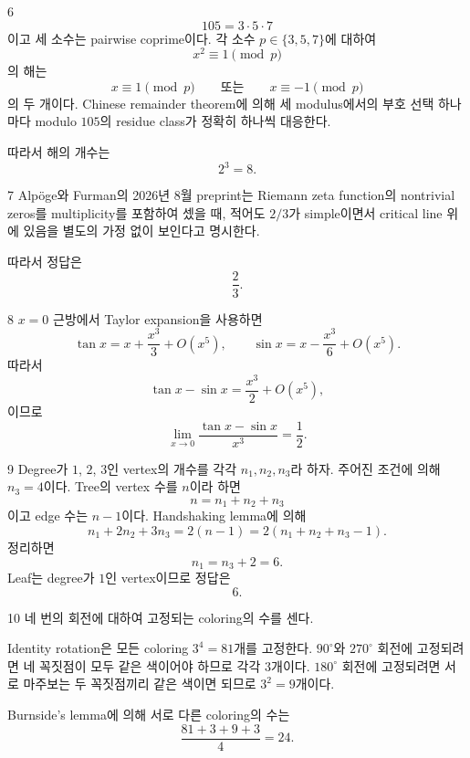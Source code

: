 \documentclass[11pt,oneside]{article}
\begin{document}
\begin{problemsolution}{6}
\[
    105=3\cdot5\cdot7
\]
이고 세 소수는 pairwise coprime이다. 각 소수 $p\in\{3,5,7\}$에 대하여
\[
    x^2\equiv1\pmod p
\]
의 해는
\[
    x\equiv1\pmod p
    \qquad\text{또는}\qquad
    x\equiv-1\pmod p
\]
의 두 개이다. Chinese remainder theorem에 의해 세 modulus에서의 부호 선택 하나마다 modulo $105$의 residue class가 정확히 하나씩 대응한다.

따라서 해의 개수는
\[
    2^3=\boxed{8}.
\]
\end{problemsolution}

\begin{problemsolution}{7}
Alp\"oge와 Furman의 2026년 8월 preprint는 Riemann zeta function의 nontrivial zeros를 multiplicity를 포함하여 셌을 때, 적어도 $2/3$가 simple이면서 critical line 위에 있음을 별도의 가정 없이 보인다고 명시한다.

따라서 정답은
\[
    \boxed{\frac23}.
\]
\end{problemsolution}

\begin{problemsolution}{8}
$x=0$ 근방에서 Taylor expansion을 사용하면
\[
    \tan x
    =x+\frac{x^3}{3}+O(x^5),
    \qquad
    \sin x
    =x-\frac{x^3}{6}+O(x^5).
\]
따라서
\[
    \tan x-\sin x
    =\frac{x^3}{2}+O(x^5),
\]
이므로
\[
    \boxed{
        \lim_{x\to0}
        \frac{\tan x-\sin x}{x^3}
        =\frac12
    }.
\]
\end{problemsolution}

\begin{problemsolution}{9}
Degree가 $1$, $2$, $3$인 vertex의 개수를 각각 $n_1,n_2,n_3$라 하자. 주어진 조건에 의해 $n_3=4$이다. Tree의 vertex 수를 $n$이라 하면
\[
    n=n_1+n_2+n_3
\]
이고 edge 수는 $n-1$이다. Handshaking lemma에 의해
\[
    n_1+2n_2+3n_3
    =2(n-1)
    =2(n_1+n_2+n_3-1).
\]
정리하면
\[
    n_1=n_3+2=6.
\]
Leaf는 degree가 $1$인 vertex이므로 정답은
\[
    \boxed{6}.
\]
\end{problemsolution}

\begin{problemsolution}{10}
네 번의 회전에 대하여 고정되는 coloring의 수를 센다.

Identity rotation은 모든 coloring $3^4=81$개를 고정한다. $90^\circ$와 $270^\circ$ 회전에 고정되려면 네 꼭짓점이 모두 같은 색이어야 하므로 각각 $3$개이다. $180^\circ$ 회전에 고정되려면 서로 마주보는 두 꼭짓점끼리 같은 색이면 되므로 $3^2=9$개이다.

Burnside's lemma에 의해 서로 다른 coloring의 수는
\[
    \frac{81+3+9+3}{4}
    =\boxed{24}.
\]
\end{problemsolution}
\end{document}

